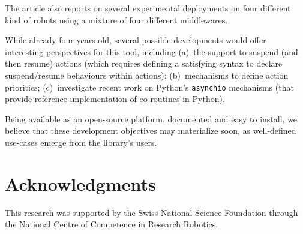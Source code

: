 \documentclass[a4paper, 10pt, conference]{ieeeconf}      %
\begin{document}
The article also reports on several experimental deployments on four different
kind of robots using a mixture of four different middlewares.

While already four years old, several possible developments would offer
interesting perspectives for this tool, including (a)~the support to suspend (and
then resume) actions (which requires defining a satisfying syntax to declare
suspend/resume behaviours within actions); (b)~mechanisms to define action
priorities; (c)~investigate recent work on Python's {\tt asynchio} mechanisms
(that provide reference implementation of co-routines in Python).

Being available as an open-source platform, documented and easy to install, we
believe that these development objectives may materialize soon, as well-defined
use-cases emerge from the library's users.

\section*{Acknowledgments}

This research was supported by the Swiss National Science Foundation through the
National Centre of Competence in Research Robotics.




\end{document}
